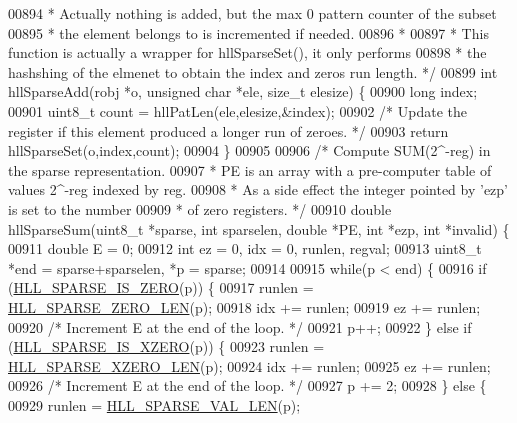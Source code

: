 \begin{DoxyCode}
{{00894 \textcolor{comment}{ * Actually nothing is added, but the max 0 pattern counter of the subset}
00895 \textcolor{comment}{ * the element belongs to is incremented if needed.}
00896 \textcolor{comment}{ *}
00897 \textcolor{comment}{ * This function is actually a wrapper for hllSparseSet(), it only performs}
00898 \textcolor{comment}{ * the hashshing of the elmenet to obtain the index and zeros run length. */}
00899 \textcolor{keywordtype}{int} hllSparseAdd(robj *o, \textcolor{keywordtype}{unsigned} \textcolor{keywordtype}{char} *ele, size\_t elesize) \{
00900     \textcolor{keywordtype}{long} index;
00901     uint8\_t count = hllPatLen(ele,elesize,&index);
00902     \textcolor{comment}{/* Update the register if this element produced a longer run of zeroes. */}
00903     \textcolor{keywordflow}{return} hllSparseSet(o,index,count);
00904 \}
00905 
00906 \textcolor{comment}{/* Compute SUM(2^-reg) in the sparse representation.}
00907 \textcolor{comment}{ * PE is an array with a pre-computer table of values 2^-reg indexed by reg.}
00908 \textcolor{comment}{ * As a side effect the integer pointed by 'ezp' is set to the number}
00909 \textcolor{comment}{ * of zero registers. */}
00910 \textcolor{keywordtype}{double} hllSparseSum(uint8\_t *sparse, \textcolor{keywordtype}{int} sparselen, \textcolor{keywordtype}{double} *PE, \textcolor{keywordtype}{int} *ezp, \textcolor{keywordtype}{int} *invalid) \{
00911     \textcolor{keywordtype}{double} E = 0;
00912     \textcolor{keywordtype}{int} ez = 0, idx = 0, runlen, regval;
00913     uint8\_t *end = sparse+sparselen, *p = sparse;
00914 
00915     \textcolor{keywordflow}{while}(p < end) \{
00916         \textcolor{keywordflow}{if} (\hyperlink{hyperloglog_8c_a0b65ae2290df116ae4ed18188dffb5ad}{HLL\_SPARSE\_IS\_ZERO}(p)) \{
00917             runlen = \hyperlink{hyperloglog_8c_a0ed89a76f49a89991af87cce34c3260b}{HLL\_SPARSE\_ZERO\_LEN}(p);
00918             idx += runlen;
00919             ez += runlen;
00920             \textcolor{comment}{/* Increment E at the end of the loop. */}
00921             p++;
00922         \} \textcolor{keywordflow}{else} \textcolor{keywordflow}{if} (\hyperlink{hyperloglog_8c_ac672e0af491e4cbfe7a5859ae4dc74f9}{HLL\_SPARSE\_IS\_XZERO}(p)) \{
00923             runlen = \hyperlink{hyperloglog_8c_a95fbeb27967ea46816fd354ddb59564e}{HLL\_SPARSE\_XZERO\_LEN}(p);
00924             idx += runlen;
00925             ez += runlen;
00926             \textcolor{comment}{/* Increment E at the end of the loop. */}
00927             p += 2;
00928         \} \textcolor{keywordflow}{else} \{
00929             runlen = \hyperlink{hyperloglog_8c_a5c74b3b50c822c01c1976a72b84db12f}{HLL\_SPARSE\_VAL\_LEN}(p);
}}
\end{DoxyCode}
